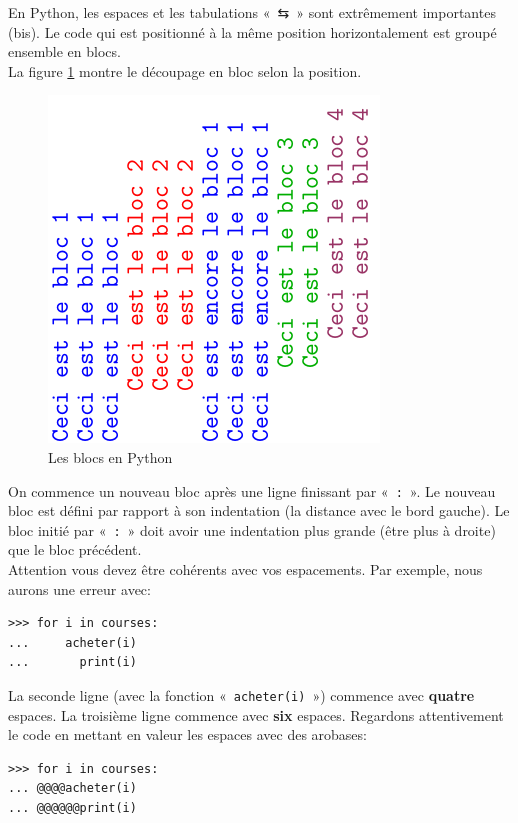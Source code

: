 En Python, les espaces et les tabulations « \textsf{⇆} » sont extrêmement  importantes (bis). Le code qui est positionné à la même position horizontalement est groupé ensemble en blocs.\\


La figure \ref{fig:blocs} montre le découpage en bloc selon la position.
\begin{figure}[H]
\centering
\includegraphics[scale=1,angle=270]{images/blocs.pdf}
\caption{Les blocs en Python}
\label{fig:blocs}
\end{figure}

On commence un nouveau bloc après une ligne finissant   par « \verb+:+ ». Le nouveau bloc est défini par rapport à son indentation (la distance avec le bord gauche). Le bloc initié par « \verb+:+ » doit avoir une indentation plus grande (être plus à droite) que le bloc précédent.\\


Attention vous devez être cohérents avec vos espacements. Par exemple, nous aurons une erreur avec:

\begin{Verbatim}[frame=single,rulecolor=\color{red}, label=erreur]
>>> for i in courses:
...     acheter(i)
...       print(i)
\end{Verbatim}

La seconde ligne (avec la fonction « \texttt{acheter(i)} ») commence avec \textbf{quatre} espaces. La troisième ligne commence avec \textbf{six} espaces. Regardons attentivement le code en mettant en valeur les espaces avec des arobases:

\begin{Verbatim}[frame=single,rulecolor=\color{gray}, label=ne pas saisir]
>>> for i in courses:
... @@@@acheter(i)
... @@@@@@print(i)
\end{Verbatim}

